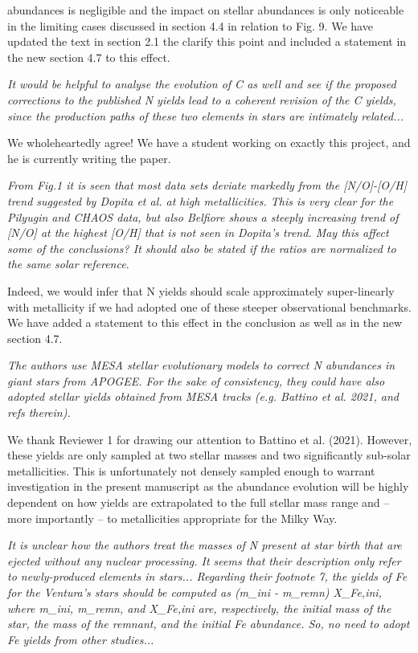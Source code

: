 \documentclass[12pt]{article}
\newcommand\doublebreak[0]{\par\null\par\noindent}
\begin{document}
abundances is negligible and the impact on stellar abundances is only
noticeable in the limiting cases discussed in section 4.4 in relation to Fig. 9.
We have updated the text in section 2.1 the clarify this point and included a
statement in the new section 4.7 to this effect.
\doublebreak
\textit{%
It would be helpful to analyse the evolution of C as well and see if the
proposed corrections to the published N yields lead to a coherent revision of
the C yields, since the production paths of these two elements in stars are
intimately related...
}
\doublebreak
We wholeheartedly agree!
We have a student working on exactly this project, and he is currently writing
the paper.
\doublebreak
\textit{%
From Fig.1 it is seen that most data sets deviate markedly from the [N/O]-[O/H]
trend suggested by Dopita et al. at high metallicities. This is very clear for
the Pilyugin and CHAOS data, but also Belfiore shows a steeply increasing trend
of [N/O] at the highest [O/H] that is not seen in Dopita's trend. May this
affect some of the conclusions? It should also be stated if the ratios are
normalized to the same solar reference.
}
\doublebreak
Indeed, we would infer that N yields should scale approximately super-linearly
with metallicity if we had adopted one of these steeper observational
benchmarks.
We have added a statement to this effect in the conclusion as well as in the
new section 4.7.
\doublebreak
\textit{%
The authors use MESA stellar evolutionary models to correct N abundances in
giant stars from APOGEE. For the sake of consistency, they could have also
adopted stellar yields obtained from MESA tracks (e.g. Battino et al. 2021, and
refs therein).
}
\doublebreak
We thank Reviewer 1 for drawing our attention to Battino et al. (2021).
However, these yields are only sampled at two stellar masses and two
significantly sub-solar metallicities.
This is unfortunately not densely sampled enough to warrant investigation in
the present manuscript as the abundance evolution will be highly dependent on
how yields are extrapolated to the full stellar mass range and -- more
importantly -- to metallicities appropriate for the Milky Way.
\doublebreak
\textit{%
It is unclear how the authors treat the masses of N present at star birth that
are ejected without any nuclear processing. It seems that their description only
refer to newly-produced elements in stars... Regarding their footnote 7, the
yields of Fe for the Ventura's stars should be computed as (m\_ini - m\_remn)
X\_Fe,ini, where m\_ini, m\_remn, and X\_Fe,ini are, respectively, the initial
mass of the star, the mass of the remnant, and the initial Fe abundance. So, no
need to adopt Fe yields from other studies...
}
\end{document}

